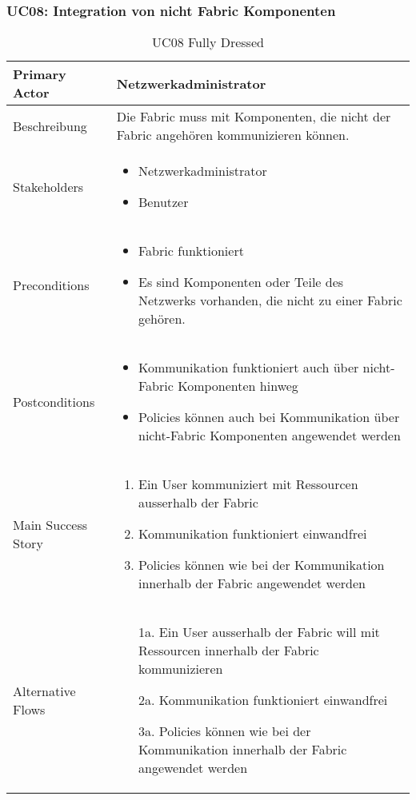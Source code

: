 \subsubsection{UC08: Integration von nicht Fabric Komponenten}
\begin{table}[H]
	\centering
	\begin{tabularx}{\textwidth}{l | X}
		Primary Actor   & Netzwerkadministrator       \\
		\hline
		Beschreibung   & Die Fabric muss mit Komponenten, die nicht der Fabric angehören kommunizieren können.  \\ 
		\hline
		Stakeholders       & 
		\begin{itemize}
			\item Netzwerkadministrator
			\item Benutzer
		\end{itemize} \\ 
		Preconditions      &
		\begin{itemize}	
			\item Fabric funktioniert
			\item Es sind Komponenten oder Teile des Netzwerks vorhanden, die nicht zu einer Fabric gehören.
		\end{itemize}  \\
		\hline
		Postconditions     & 
		\begin{itemize}	
			\item Kommunikation funktioniert auch über nicht-Fabric Komponenten hinweg
			\item Policies können auch bei Kommunikation über nicht-Fabric Komponenten angewendet werden
		\end{itemize}  \\
		\hline
		Main Success Story & 
		\begin{enumerate}
			\item Ein User kommuniziert mit Ressourcen ausserhalb der Fabric
			\item Kommunikation funktioniert einwandfrei
			\item Policies können wie bei der Kommunikation innerhalb der Fabric angewendet werden
		\end{enumerate}
		\\
		\hline
		Alternative Flows  & 
		\begin{itemize}
			\item[1a.]  Ein User ausserhalb der Fabric will mit Ressourcen innerhalb der Fabric kommunizieren
			\item[2a.] Kommunikation funktioniert einwandfrei
			\item[3a.] Policies können wie bei der Kommunikation innerhalb der Fabric angewendet werden
		\end{itemize}
	\end{tabularx}
	\caption{UC08 Fully Dressed}
	\label{tab:UC08}
\end{table}

